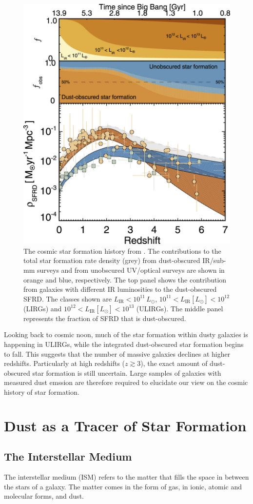 \begin{figure}
    \centering
	\includegraphics[width=0.75\columnwidth]{Figures/cosmic_sfrd.jpeg}
	\caption{The cosmic star formation history from \citealt{Zavala_2021}. The contributions to the total star formation rate density (grey) from dust-obscured IR/sub-mm surveys and from unobscured UV/optical surveys are shown in orange and blue, respectively. The top panel shows the contribution from galaxies with different IR luminosities to the dust-obscured SFRD. The classes shown are $L_\textrm{IR} < 10^{11}\,L_\odot$, $10^{11} < L_\textrm{IR} [L_\odot] < 10^{12}$ (LIRGs) and $10^{12} < L_\textrm{IR} [L_\odot] < 10^{13}$ (ULIRGs). The middle panel represents the fraction of SFRD that is dust-obscured.}
	\label{fig:cosmic_sfrd}
\end{figure}

Looking back to cosmic noon, much of the star formation within dusty galaxies is happening in ULIRGs, while the integrated dust-obscured star formation begins to fall. This suggests that the number of massive galaxies declines at higher redshifts. Particularly at high redshifts ($z \gtrsim 3$), the exact amount of dust-obscured star formation is still uncertain. Large samples of galaxies with measured dust emssion are therefore required to elucidate our view on the cosmic history of star formation.

\section{Dust as a Tracer of Star Formation}

\subsection{The Interstellar Medium}

The interstellar medium (ISM) refers to the matter that fills the space in between the stars of a galaxy. The matter comes in the form of gas, in ionic, atomic and molecular forms, and dust.

